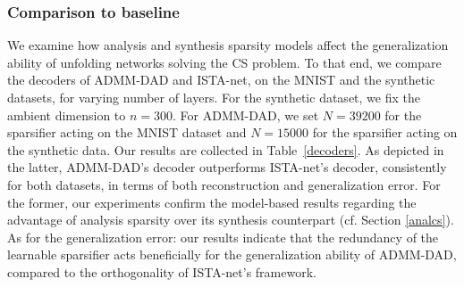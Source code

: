 \documentclass[preprint,12pt]{elsarticle}
\begin{document}
\subsubsection{Comparison to baseline}\label{baselinecomp}
We examine how analysis and synthesis sparsity models affect the generalization ability of unfolding networks solving the CS problem. To that end, we compare the decoders of ADMM-DAD and ISTA-net, on the MNIST and the synthetic datasets, for varying number of layers. For the synthetic dataset, we fix the ambient dimension to $n=300$. For ADMM-DAD, we set $N=39200$ for the sparsifier acting on the MNIST dataset and $N=15000$ for the sparsifier acting on the synthetic data. Our results are collected in Table~\ref{decoders}. As depicted in the latter, ADMM-DAD's decoder outperforms ISTA-net's decoder, consistently for both datasets, in terms of both reconstruction and generalization error. For the former, our experiments confirm the model-based results regarding the advantage of analysis sparsity over its synthesis counterpart (cf. Section \ref{analcs}). As for the generalization error: our results indicate that the redundancy of the learnable sparsifier acts beneficially for the generalization ability of ADMM-DAD, compared to the orthogonality of ISTA-net's framework.
\end{document}
